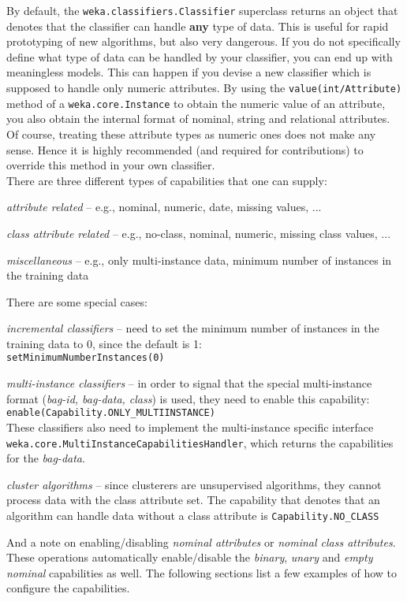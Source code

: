 \newpage
{}
\label{classifier_capabilities}
By default, the \texttt{weka.classifiers.Classifier} superclass returns an
object that denotes that the classifier can handle \textbf{any} type of data.
This is useful for rapid prototyping of new algorithms, but also very
dangerous. If you do not specifically define what type of data can be handled by
your classifier, you can end up with meaningless models. This can happen if you
devise a new classifier which is supposed to handle only numeric attributes. By
using the \texttt{value(int/Attribute)} method of a \texttt{weka.core.Instance}
to obtain the numeric value of an attribute, you also obtain the internal format
of nominal, string and relational attributes. Of course, treating these
attribute types as numeric ones does not make any sense. Hence it is highly
recommended (and required for contributions) to override this method in your own
classifier. \\

\noindent There are three different types of capabilities that one can supply:
\begin{tight_enumerate}
  \item \textit{attribute related} -- e.g., nominal, numeric, date, missing
values, ...
  \item \textit{class attribute related} -- e.g., no-class, nominal, numeric,
missing class values, ...
  \item \textit{miscellaneous} -- e.g., only multi-instance data, minimum number
of instances in the training data
\end{tight_enumerate}
There are some special cases:
\begin{tight_itemize}
  \item \textit{incremental classifiers} -- need to set the minimum number of
instances in the training data to 0, since the default is 1: \\
  \texttt{setMinimumNumberInstances(0)}
  
  \item \textit{multi-instance classifiers} -- in order to signal that the
special multi-instance format (\textit{bag-id, bag-data, class}) is used, they
need to enable this capability: \\
  \texttt{enable(Capability.ONLY\_MULTIINSTANCE)} \\
  These classifiers also need to implement the multi-instance specific interface
\texttt{weka.core.MultiInstanceCapabilitiesHandler}, which returns the
capabilities for the \textit{bag-data}.

  \item \textit{cluster algorithms} -- since clusterers are unsupervised
algorithms, they cannot process data with the class attribute set. The
capability that denotes that an algorithm can handle data without a class
attribute is \texttt{Capability.NO\_CLASS}
\end{tight_itemize}
And a note on enabling/disabling \textit{nominal attributes} or \textit{nominal
class attributes}. These operations automatically enable/disable the
\textit{binary}, \textit{unary} and \textit{empty nominal} capabilities as well.
The following sections list a few examples of how to configure the capabilities.

